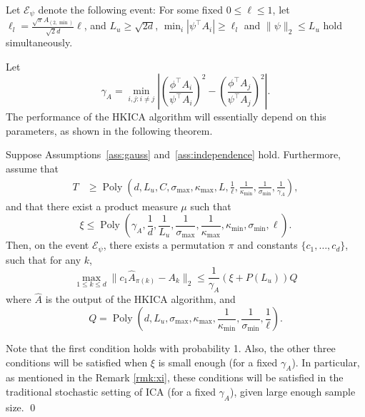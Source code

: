 \documentclass[twoside,11pt]{article}
\newcommand{\Epsi}{\mathcal{E}_{\psi}}
\DeclareMathOperator{\pol}{Poly}
\newcommand{\poly}[1]{\pol\left(#1\right)}
\begin{document}
\begin{definition}
Let $\Epsi$ denote the following event: For some fixed $0\le \ell\le 1$, let $\ell_l = \frac{\sqrt{\pi}A_{(2,\min)}}{\sqrt{2}d} \ell$, and $ L_u \ge \sqrt{2d}$,
$\min_i |\psi^{\top}A_i| \ge \ell_l$ and $\|\psi\|_2 \le L_u$ hold simultaneously. 
\end{definition}
Let 
\begin{equation}
\label{def:kappa}
\gamma_A =  \min_{i,j: i\neq j} \left\vert \left(\frac{\phi^{\top}A_i}{\psi^{\top}A_i}\right)^2 - \left(\frac{\phi^{\top}A_j}{\psi^{\top}A_j}\right)^2 \right\vert. 
\end{equation}
The performance of the HKICA algorithm will essentially depend on this parameters, as shown in the following theorem.
\begin{theorem}
 \label{thm:efficiency} 
Suppose Assumptions~\ref{ass:gauss} and~\ref{ass:independence} hold. 
Furthermore, assume that
\begin{align*}
T & \ge \poly{d, L_u, C, \sigma_{\max},\kappa_{\max}, L,\frac{1}{\ell}, \frac{1}{\kappa_{\min}}, \frac{1}{\sigma_{\min}}, \frac{1}{\gamma_A}},
\end{align*}
and that there exist a product measure $\mu$ such that 
\[
\xi \le \poly{\gamma_A, \frac{1}{d}, \frac{1}{L_u}, \frac{1}{\sigma_{\max}}, \frac{1}{\kappa_{\max}}, \kappa_{\min}, \sigma_{\min}, \ell}.
\] 
Then, on the event $\Epsi$, there exists a permutation $\pi$ and constants $\{c_1,\ldots,c_d\}$, such that for any $k$,
\begin{equation}
\label{eq:HKICA-bound}
  \max_{1\le k\le d}\| c_1\hat{A}_{\pi(k)} - A_k\|_2 \le
  \frac{1}{\gamma_A} (\xi + P(L_u))Q
\end{equation}
where $\hat{A}$ is the output of the HKICA algorithm, and 
\[Q=\poly{d, L_u, \sigma_{\max}, \kappa_{\max}, \frac{1}{\kappa_{\min}}, \frac{1}{\sigma_{\min}}, \frac{1}{\ell}}.\]
 \end{theorem}
\begin{remark}
Note that the first condition holds with probability 1. Also, the other three conditions will be satisfied when $\xi$ is small enough (for a fixed $\gamma_A$).
In particular, as mentioned in the Remark \ref{rmk:xi}, these conditions will be satisfied in the traditional stochastic setting of ICA (for a fixed $\gamma_A$), given large enough sample size. \qed
\end{remark}
\end{document}
